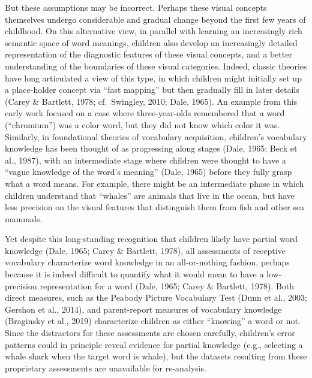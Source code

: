 \documentclass[
  man,mask]{apa6}
\begin{document}
But these assumptions may be incorrect. Perhaps these visual concepts themselves undergo considerable and gradual change beyond the first few years of childhood. On this alternative view, in parallel with learning an increasingly rich semantic space of word meanings, children also develop an increasingly detailed representation of the diagnostic features of these visual concepts, and a better understanding of the boundaries of these visual categories. Indeed, classic theories have long articulated a view of this type, in which children might initially set up a place-holder concept via ``fast mapping'' but then gradually fill in later details (Carey \& Bartlett, 1978; cf.~Swingley, 2010; Dale, 1965). An example from this early work focused on a case where three-year-olds remembered that a word (``chromium'') was a color word, but they did not know which color it was. Similarly, in foundational theories of vocabulary acquisition, children's vocabulary knowledge has been thought of as progressing along stages (Dale, 1965; Beck et al., 1987), with an intermediate stage where children were thought to have a ``vague knowledge of the word's meaning'' (Dale, 1965) before they fully grasp what a word means. For example, there might be an intermediate phase in which children understand that ``whales'' are animals that live in the ocean, but have less precision on the visual features that distinguish them from fish and other sea mammals.

Yet despite this long-standing recognition that children likely have partial word knowledge (Dale, 1965; Carey \& Bartlett, 1978), all assessments of receptive vocabulary characterize word knowledge in an all-or-nothing fashion, perhaps because it is indeed difficult to quantify what it would mean to have a low-precision representation for a word (Dale, 1965; Carey \& Bartlett, 1978). Both direct measures, such as the Peabody Picture Vocabulary Test (Dunn et al., 2003; Gershon et al., 2014), and parent-report measures of vocabulary knowledge (Braginsky et al., 2019) characterize children as either ``knowing'' a word or not. Since the distractors for these assessments are chosen carefully, children's error patterns could in principle reveal evidence for partial knowledge (e.g., selecting a whale shark when the target word is whale), but the datasets resulting from these proprietary assessments are unavailable for re-analysis.
\end{document}
